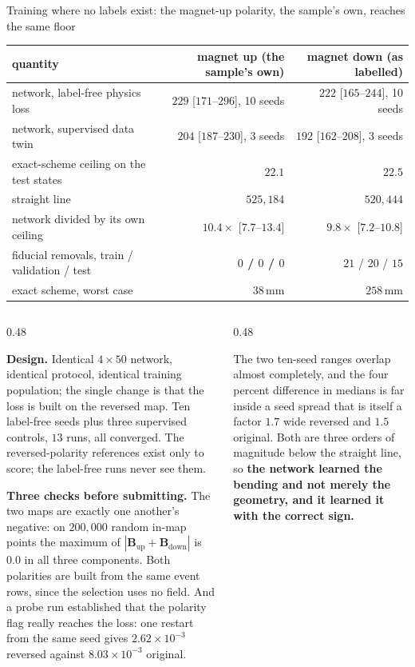 \documentclass[aspectratio=169,10pt]{beamer}
\newcommand{\mm}{\ensuremath{\,\mathrm{mm}}}
\newcommand{\hl}[1]{{\color{accent}\textbf{#1}}}
\newcommand{\bad}[1]{{\color{warm}\textbf{#1}}}
\begin{document}
\begin{frame}[shrink=25]{Training where no labels exist: the magnet-up polarity, the sample's own, reaches the same floor}
  \vspace{2mm}
  \centering\small
  \begin{tabular}{@{}lrr@{}}
    \toprule
    quantity & magnet up (the sample's own) & magnet down (as labelled) \\
    \midrule
    network, label-free physics loss & \hl{$229$} [$171$--$296$], 10 seeds & \hl{$222$} [$165$--$244$], 10 seeds \\
    network, supervised data twin    & $204$ [$187$--$230$], 3 seeds  & $192$ [$162$--$208$], 3 seeds \\
    exact-scheme ceiling on the test states & $22.1$ & $22.5$ \\
    straight line & $525{,}184$ & $520{,}444$ \\
    network divided by its own ceiling & $10.4\times$ [$7.7$--$13.4$] & $9.8\times$ [$7.2$--$10.8$] \\
    fiducial removals, train / validation / test & \bad{$0$ / $0$ / $0$} & $21$ / $20$ / $15$ \\
    exact scheme, worst case & $38\mm$ & $258\mm$ \\
    \bottomrule
  \end{tabular}
  \vspace{2mm}

  \begin{columns}[T]
    \begin{column}{0.48\textwidth}
      {\footnotesize \textbf{Design.} Identical $4\times50$ network, identical
       protocol, identical training population; the single change is that the
       loss is built on the reversed map. Ten label-free seeds plus three
       supervised controls, $13$ runs, all converged. The reversed-polarity
       references exist only to score; the label-free runs never see them.
       \smallskip

       \textbf{Three checks before submitting.} The two maps are exactly one
       another's negative: on $200{,}000$ random in-map points the maximum of
       $|\mathbf{B}_{\mathrm{up}} + \mathbf{B}_{\mathrm{down}}|$ is $0.0$ in all
       three components. Both polarities are built from the same event rows,
       since the selection uses no field. And a probe run established that the
       polarity flag really reaches the loss: one restart from the same seed
       gives $2.62\times10^{-3}$ reversed against $8.03\times10^{-3}$ original.}
    \end{column}
    \begin{column}{0.48\textwidth}
      {\footnotesize The two ten-seed ranges overlap almost completely, and the
       four percent difference in medians is far inside a seed spread that is
       itself a factor $1.7$ wide reversed and $1.5$ original. Both are three
       orders of magnitude below the straight line, so \hl{the network learned
       the bending and not merely the geometry, and it learned it with the
       correct sign.}
       \smallskip

}
\end{column}
\end{columns}
\end{frame}
\end{document}
